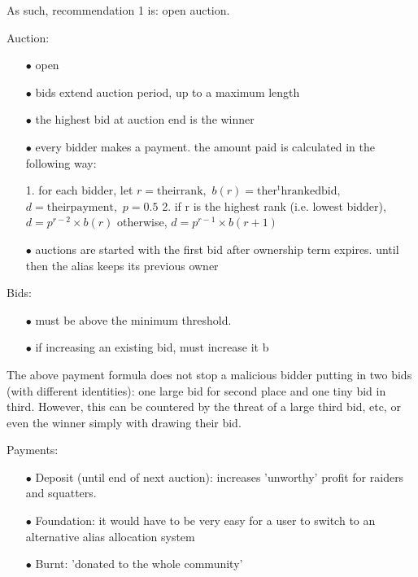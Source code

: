 \documentclass[10pt,a4paper]{article}
\begin{document}
{As such, recommendation 1 is: open auction.

Auction:

\begin{enumerate}
\item[$\bullet$] open
\item[$\bullet$] bids extend auction period, up to a maximum length
\item[$\bullet$] the highest bid at auction end is the winner
\item[$\bullet$] every bidder makes a payment. the amount paid is calculated in the following way:

	1. for each bidder, let 
		$r = \mathrm{their rank},$
		$b(r) = \mathrm{the r^th ranked bid},$
		$d = \mathrm{their payment},$
		$p = 0.5$
	2. if r is the highest rank (i.e. lowest bidder),
		$d = p^{r - 2} \times b(r)$
	   otherwise, 
		$d = p^{r - 1} \times b(r + 1)$
		
\item[$\bullet$] auctions are started with the first bid after ownership term expires. until then the alias keeps its previous owner 
\end{enumerate}

Bids:

\begin{enumerate}
\item[$\bullet$] must be above the minimum threshold.
\item[$\bullet$] if increasing an existing bid, must increase it b
\end{enumerate}

The above payment formula does not stop a malicious bidder putting in two bids (with different identities): one large bid for second place and one tiny bid in third. However, this can be countered by the threat of a large third bid, etc, or even the winner simply with drawing their bid.



Payments:

\begin{enumerate}
\item[$\bullet$] Deposit (until end of next auction): increases 'unworthy' profit for raiders and squatters.
\item[$\bullet$] Foundation: it would have to be very easy for a user to switch to an alternative alias allocation system
\item[$\bullet$] Burnt: 'donated to the whole community'
\end{enumerate}

}
\end{document}
